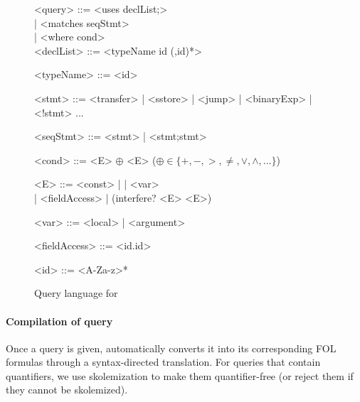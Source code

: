 \begin{figure}[hbt!]
  \setlength{\grammarparsep}{0em}
    \begin{grammar}
    <query> ::= <uses declList;>  \\
    | <matches {seqStmt}> \\
    | <where cond> \\
    
    <declList> ::= <typeName id (,id)*>
    
    <typeName> ::= <id> 
    
    <stmt> ::= <transfer> | <sstore> | <jump> | <binaryExp> | <!stmt> ...
    
    <seqStmt> ::= <stmt> | <stmt;stmt>  
    
    <cond> ::=  <E> $\oplus$ <E> 
 ($\oplus\in\{+, -, >, \neq, \vee, \wedge, ...\}$)
 
   <E> ::= <const> |  | <var> \\
   | <fieldAccess> | (interfere? <E> <E>)
   
   <var> ::= <local> | <argument>
   
   <fieldAccess> ::= <id.id>
   
   <id> ::= <A-Za-z>*

    \end{grammar}
  \caption{Query language for \toolname}
  \label{fig:query-lang}
  \end{figure}

\paragraph{Compilation of query} 
Once a query is given, \toolname automatically converts it into its corresponding FOL formulas through a syntax-directed translation. For queries that contain quantifiers, we use skolemization to make them quantifier-free  (or reject them if they cannot be skolemized).


